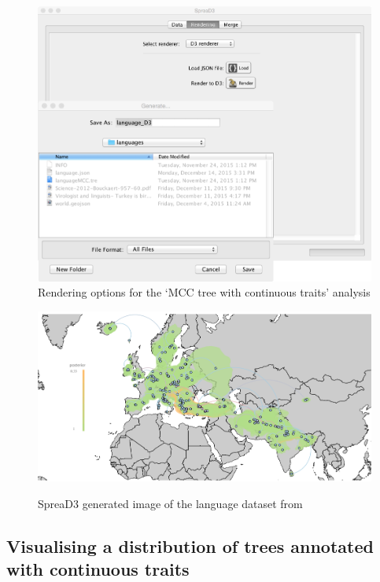 \documentclass[english]{paper}
\def \spreadname {SpreaD3}
\begin{document}
\begin{figure}%
\centering
\includegraphics[width=1\textwidth]{./figures/Fig4_continu_render} 
\caption{Rendering options for the `MCC tree with continuous traits' analysis}
\label{fig:renderMCCcont}
\end{figure}

\begin{figure}%
\centering
\includegraphics[width=1\textwidth]{./figures/new_image_cont_language.pdf} 
\label{fig:imageMCCcont}
\caption{{\spreadname} generated image of the language dataset from \citet{Bouckaert:2012aa}}
\end{figure}


\subsection{Visualising a distribution of trees annotated with continuous traits}
\label{contTreeDistr}
% 
\end{document}
